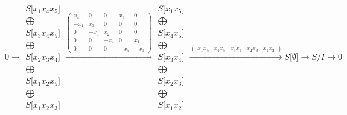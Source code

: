 \documentclass[12pt,a3paper,landscape]{amsart}
\numberwithin{equation}{section}
\theoremstyle{plain}
\theoremstyle{definition}
\begin{document}
$$
0 \rightarrow \begin{matrix}
S \lbrack x_{1}x_{4}x_{5} \rbrack \\ \bigoplus \\
S \lbrack x_{3}x_{4}x_{5} \rbrack \\ \bigoplus \\
S \lbrack x_{2}x_{3}x_{4} \rbrack \\ \bigoplus \\
S \lbrack x_{1}x_{2}x_{5} \rbrack \\ \bigoplus \\
S \lbrack x_{1}x_{2}x_{3} \rbrack
\end{matrix}
\xrightarrow{\left( \begin{matrix}
x_{4} & 0 & 0 & x_{2} & 0 \\
-x_{1} & x_{3} & 0 & 0 & 0 \\
0 & -x_{5} & x_{2} & 0 & 0 \\
0 & 0 & -x_{4} & 0 & x_{1} \\
0 & 0 & 0 & -x_{5} & -x_{3}
\end{matrix} \right)}\begin{matrix}
S \lbrack x_{1}x_{5} \rbrack \\ \bigoplus \\
S \lbrack x_{4}x_{5} \rbrack \\ \bigoplus \\
S \lbrack x_{3}x_{4} \rbrack \\ \bigoplus \\
S \lbrack x_{2}x_{3} \rbrack \\ \bigoplus \\
S \lbrack x_{1}x_{2} \rbrack
\end{matrix}
\xrightarrow{\left( \begin{matrix}
x_{1}x_{5} & x_{4}x_{5} & x_{3}x_{4} & x_{2}x_{3} & x_{1}x_{2}
\end{matrix} \right)}S \lbrack \emptyset \rbrack \rightarrow S/I \rightarrow 0
$$
\end{document}
